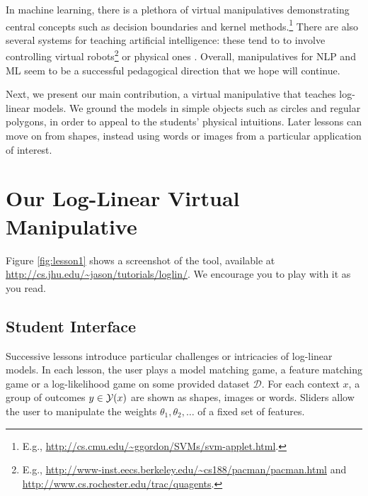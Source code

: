 \documentclass[11pt,letterpaper]{article}
\newcommand{\Note}[1]{}
\renewcommand{\Note}[1]{\hl{[#1]}}  %
\newcommand{\NoteSigned}[3]{{\sethlcolor{#2}\Note{#1: #3}}}
\newcommand{\NoteJE}[1]{\NoteSigned{JE}{LightGreen}{#1}}
\newcommand{\Data}[0]{\ensuremath{\mathcal{D}}}
\newcommand{\WhereToFind}[0]{\url{http://cs.jhu.edu/~jason/tutorials/loglin/}}
\begin{document}
In machine learning, there is a plethora of virtual manipulatives demonstrating central concepts such 
as decision boundaries and kernel
methods.\footnote{E.g.,
  \url{http://cs.cmu.edu/~ggordon/SVMs/svm-applet.html}.
}
There are also several systems for teaching artificial intelligence: these tend to to involve controlling 
virtual robots\footnote{E.g., \url{http://www-inst.eecs.berkeley.edu/~cs188/pacman/pacman.html} and 
\url{http://www.cs.rochester.edu/trac/quagents}.}
or physical ones \cite{tokic2012robot}.
Overall, manipulatives for NLP and ML seem to be a successful
pedagogical direction that we hope will continue.

Next, we present our main contribution, a virtual manipulative that teaches log-linear models. We ground 
the models in simple objects such as circles and regular polygons, in order to appeal to the 
students' physical intuitions.  Later lessons can move on 
from shapes, instead using words or images from a particular
application of interest.


\section{Our Log-Linear Virtual Manipulative}\label{sec:overview}

Figure \ref{fig:lesson1} shows a screenshot
of the tool, available at 
\WhereToFind{}. We encourage you to play with it as you read.



\subsection{Student Interface}

Successive lessons introduce particular challenges or intricacies of
log-linear models.  In each lesson, the user plays a model matching
game, a feature matching game or a log-likelihood game on some provided dataset \Data{}.
For each context $x$, a group of outcomes $y \in {\cal Y}(x)$ are
shown as shapes, images or words.  Sliders allow the user to
manipulate the weights $\theta_1, \theta_2, \ldots$ of a fixed set of
features.  
\end{document}
